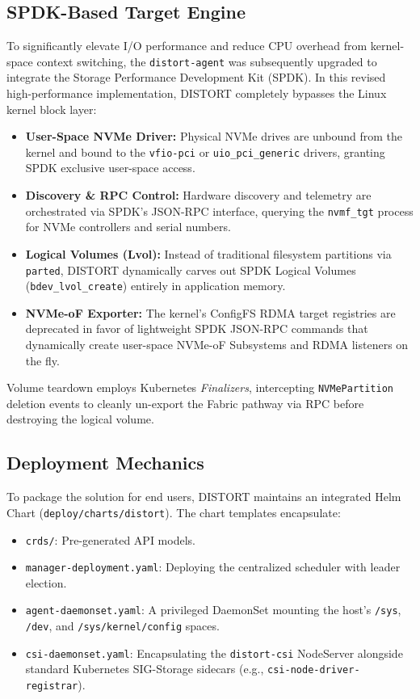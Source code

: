 \documentclass[sigconf]{acmart}
\begin{document}
\subsection{SPDK-Based Target Engine}
To significantly elevate I/O performance and reduce CPU overhead from kernel-space context switching, the \texttt{distort-agent} was subsequently upgraded to integrate the Storage Performance Development Kit (SPDK). In this revised high-performance implementation, DISTORT completely bypasses the Linux kernel block layer:
\begin{itemize}
    \item \textbf{User-Space NVMe Driver:} Physical NVMe drives are unbound from the kernel and bound to the \texttt{vfio-pci} or \texttt{uio\_pci\_generic} drivers, granting SPDK exclusive user-space access.
    \item \textbf{Discovery \& RPC Control:} Hardware discovery and telemetry are orchestrated via SPDK's JSON-RPC interface, querying the \texttt{nvmf\_tgt} process for NVMe controllers and serial numbers.
    \item \textbf{Logical Volumes (Lvol):} Instead of traditional filesystem partitions via \texttt{parted}, DISTORT dynamically carves out SPDK Logical Volumes (\texttt{bdev\_lvol\_create}) entirely in application memory.
    \item \textbf{NVMe-oF Exporter:} The kernel's ConfigFS RDMA target registries are deprecated in favor of lightweight SPDK JSON-RPC commands that dynamically create user-space NVMe-oF Subsystems and RDMA listeners on the fly.
\end{itemize}
Volume teardown employs Kubernetes \textit{Finalizers}, intercepting \texttt{NVMePartition} deletion events to cleanly un-export the Fabric pathway via RPC before destroying the logical volume.

\subsection{Deployment Mechanics}
To package the solution for end users, DISTORT maintains an integrated Helm Chart (\texttt{deploy/charts/distort}). The chart templates encapsulate:
\begin{itemize}
    \item \texttt{crds/}: Pre-generated API models.
    \item \texttt{manager-deployment.yaml}: Deploying the centralized scheduler with leader election.
    \item \texttt{agent-daemonset.yaml}: A privileged DaemonSet mounting the host's \texttt{/sys}, \texttt{/dev}, and \texttt{/sys/kernel/config} spaces.
    \item \texttt{csi-daemonset.yaml}: Encapsulating the \texttt{distort-csi} NodeServer alongside standard Kubernetes SIG-Storage sidecars (e.g., \texttt{csi-node-driver-registrar}).
\end{itemize}
\end{document}
